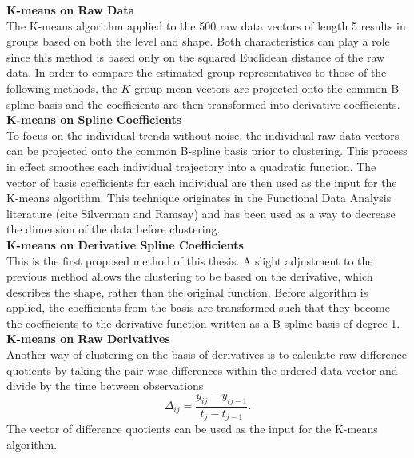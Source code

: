 \documentclass[12pt]{article}
\begin{document}
\textbf{K-means on Raw Data}\\
The K-means algorithm applied to the 500 raw data vectors of length 5 results in groups based on both the level and shape. Both characteristics can play a role since this method is based only on the squared Euclidean distance of the raw data. In order to compare the estimated group representatives to those of the following methods, the $K$ group mean vectors are projected onto the common B-spline basis and the coefficients are then transformed into derivative coefficients.  \\

\textbf{K-means on Spline Coefficients}\\
To focus on the individual trends without noise, the individual raw data vectors can be projected onto the common B-spline basis prior to clustering. This process in effect smoothes each individual trajectory into a quadratic function. The vector of basis coefficients for each individual are then used as the input for the K-means algorithm. This technique originates in the Functional Data Analysis literature (cite Silverman and Ramsay) and has been used as a way to decrease the dimension of the data before clustering. \\

\textbf{K-means on Derivative Spline Coefficients}\\
This is the first proposed method of this thesis. A slight adjustment to the previous method allows the clustering to be based on the derivative, which describes the shape, rather than the original function. Before algorithm is applied, the coefficients from the basis are transformed such that they become the coefficients to the derivative function written as a B-spline basis of degree 1. \\

\textbf{K-means on Raw Derivatives}\\
Another way of clustering on the basis of derivatives is to calculate raw difference quotients by taking the pair-wise differences within the ordered data vector and divide by the time between observations
$$\Delta_{ij} = \frac{y_{ij}-y_{ij-1}}{t_{j}-t_{j-1}}.$$
The vector of difference quotients can be used as the input for the K-means algorithm.\\
\end{document}
